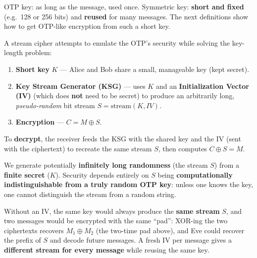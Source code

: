 \begin{rembox}[title=Difference with the OTP]
OTP key: as long as the message, used once. Symmetric key: \textbf{short and fixed}
(e.g.\ 128 or 256 bits) and \textbf{reused} for many messages. The next definitions show
how to get OTP-like encryption from such a short key.
\end{rembox}

\begin{defnbox}[title=Stream cipher (pseudo-OTP)]
A stream cipher attempts to emulate the OTP's security while solving the key-length
problem:
\begin{enumerate}
  \item \textbf{Short key} $K$ --- Alice and Bob share a small, manageable key (kept
        secret).
  \item \textbf{Key Stream Generator (KSG)} --- uses $K$ and an \textbf{Initialization
        Vector (IV)} (which does \textbf{not} need to be secret) to produce an
        arbitrarily long, \emph{pseudo-random} bit stream $S = \mathrm{stream}(K, IV)$.
  \item \textbf{Encryption} --- $C = M \oplus S$.
\end{enumerate}
To \textbf{decrypt}, the receiver feeds the KSG with the shared key and the IV (sent with
the ciphertext) to recreate the same stream $S$, then computes $C \oplus S = M$.
\end{defnbox}

\begin{propbox}[title=Security of the KSG]
We generate potentially \textbf{infinitely long randomness} (the stream $S$) from a
\textbf{finite secret} ($K$). Security depends entirely on $S$ being
\textbf{computationally indistinguishable from a truly random OTP key}: unless one knows
the key, one cannot distinguish the stream from a random string.
\end{propbox}

\begin{rembox}[title=Why does the KSG also take an IV?]
Without an IV, the same key would always produce the \textbf{same stream} $S$, and two
messages would be encrypted with the same ``pad'': XOR-ing the two ciphertexts recovers
$M_1 \oplus M_2$ (the two-time pad above), and Eve could recover the prefix of $S$ and
decode future messages. A fresh IV per message gives a \textbf{different stream for every
message} while reusing the same key.
\end{rembox}

